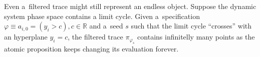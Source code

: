 \documentclass[12pt,oneside,draft]{fithesis}
\newcommand{\mReal}{\mathbb{R}}
\newtheorem{mydef}{Definition}
\begin{document}
Even a~filtered trace might still represent an endless object. Suppose
the dynamic system phase space contains a limit cycle. Given
a~specification $\varphi\equiv a_{i,0}=(y_i>c),c\in\mReal$ and a~seed
$s$ such that the limit cycle ``crosses'' with an hyperplane $y_i=c$,
the filtered trace $\pi_{\varphi_s}$ contains infinitelly many points
as the atomic proposition keeps changing its evaluation forever.

%

%
%
\end{document}
